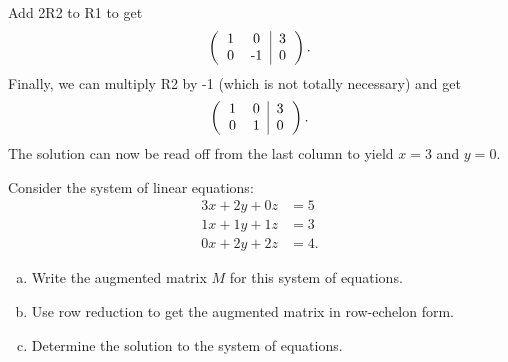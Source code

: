 \documentclass[12pt]{article} %
\begin{document}
\begin{solution}
\begin{enumerate}[(a)]
\[        \]
        Add 2R2 to R1 to get 
        \[
        \left( \begin{tabular} {cc | c} 1 & 0 & 3 \\ 0 & -1 & 0 \end{tabular} \right).
        \]
        Finally, we can multiply R2 by -1 (which is not totally necessary) and get
        \[
        \left( \begin{tabular} {cc | c} 1 & 0 & 3 \\ 0 & 1 & 0 \end{tabular} \right).
        \]
        The solution can now be read off from the last column to yield $x=3$ and $y=0$.
   \end{enumerate}  
\end{solution}


\newpage
\begin{problem}
Consider the system of linear equations:
\begin{align*}
    3x+2y+0z&=5\\
    1x+1y+1z&=3\\
    0x+2y+2z&=4.
\end{align*}
\begin{enumerate}[(a)]
    \item Write the augmented matrix $M$ for this system of equations.
    \item Use row reduction to get the augmented matrix in row-echelon form.
    \item Determine the solution to the system of equations.
\end{enumerate}
\end{problem}
\end{document}
